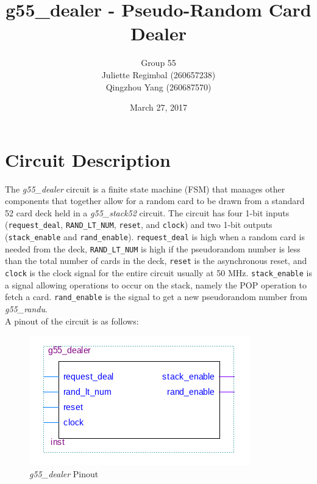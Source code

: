 \documentclass[12pt]{article}
\title{g55\_dealer - Pseudo-Random Card Dealer}
\author{Group 55\\Juliette Regimbal (260657238)\\Qingzhou Yang (260687570)}
\date{March 27, 2017}
\begin{document}
\maketitle
\setlength{\parindent}{0ex}
\section{Circuit Description}
The \textit{g55\_dealer} circuit is a finite state machine (FSM) that manages other components that together allow for a random card to be drawn from a standard 52 card deck held in a \textit{g55\_stack52} circuit. The circuit has four 1-bit inputs (\texttt{request\_deal}, \texttt{RAND\_LT\_NUM}, \texttt{reset}, and \texttt{clock}) and two 1-bit outputs (\texttt{stack\_enable} and \texttt{rand\_enable}). \texttt{request\_deal} is high when a random card is needed from the deck, \texttt{RAND\_LT\_NUM} is high if the pseudorandom number is less than the total number of cards in the deck, \texttt{reset} is the asynchronous reset, and \texttt{clock} is the clock signal for the entire circuit usually at 50 MHz. \texttt{stack\_enable} is a signal allowing operations to occur on the stack, namely the POP operation to fetch a card. \texttt{rand\_enable} is the signal to get a new pseudorandom number from \textit{g55\_randu}. \\

A pinout of the circuit is as follows:\\

\begin{figure}[H]
\centering
\includegraphics[scale=0.4]{graphics/dealer-pinout.png}
\caption{\textit{g55\_dealer} Pinout}
\end{figure}
\end{document}
